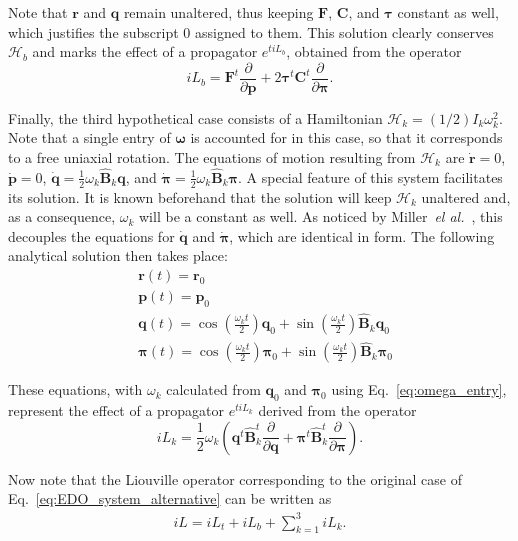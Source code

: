 \documentclass[aip,jcp,reprint,amsmath,amssymb,raggedbottom]{revtex4-1}
\newcommand{\mt}[1]{\boldsymbol{\mathbf{#1}}}           %
\newcommand{\vt}[1]{\boldsymbol{\mathbf{#1}}}           %
\newcommand{\tr}[1]{#1^t}                               %
\newcommand{\diff}[2]{\dfrac{\partial #1}{\partial #2}} %
\begin{document}
Note that $\vt r$ and $\vt q$ remain unaltered, thus keeping $\vt F$, $\mt C$, and $\vt \tau$ constant as well, which justifies the subscript $0$ assigned to them. This solution clearly conserves $\mathcal{H}_b$ and marks the effect of a propagator $e^{t i\!L_b}$, obtained from the operator
\[
i\!L_b = \tr{\vt F} \diff{}{\vt p} + 2 \tr{\vt \tau} \tr{\mt C} \diff{}{\vt \pi}.
\]

Finally, the third hypothetical case consists of a Hamiltonian $\mathcal{H}_k = (1/2) I_k \omega_k^2$. Note that a single entry of $\vt \omega$ is accounted for in this case, so that it corresponds to a free uniaxial rotation. The equations of motion resulting from $\mathcal{H}_k$ are $\dot{\vt r} = 0$, $\dot{\vt p} = 0$, $\dot{\vt q} = \frac{1}{2} \omega_k \hat{\mt B}_k \vt q$, and $\dot{\vt \pi} = \frac{1}{2} \omega_k \hat{\mt B}_k \vt \pi$. A special feature of this system facilitates its solution. It is known beforehand that the solution will keep $\mathcal{H}_k$ unaltered and, as a consequence, $\omega_k$ will be a constant as well. As noticed by Miller~\textit{el al.}~\cite{Miller2002}, this decouples the equations for $\dot{\vt q}$ and $\dot{\vt \pi}$, which are identical in form. The following analytical solution then takes place:\cite{Miller2002}
\begin{align*}
&{\vt r}(t) = {\vt r}_0 \\
&{\vt p}(t) = {\vt p}_0 \\
&{\vt q}(t) = \cos\left(\frac{\omega_k t}{2}\right) \vt q_0 + \sin\left(\frac{\omega_k t}{2}\right) \hat{\mt B}_k \vt q_0 \\
&{\vt \pi}(t) = \cos\left(\frac{\omega_k t}{2}\right) \vt \pi_0 + \sin\left(\frac{\omega_k t}{2}\right) \hat{\mt B}_k \vt \pi_0
\end{align*}

These equations, with $\omega_k$ calculated from $\vt q_0$ and $\vt \pi_0$ using Eq.~\ref{eq:omega_entry}, represent the effect of a propagator $e^{t i\!L_k}$ derived from the operator
\[
i\!L_k = \frac{1}{2} \omega_k \left( \tr{\vt q}\tr{\hat{\mt B}_k} \diff{}{\vt q} + \tr{\vt \pi}\tr{\hat{\mt B}_k} \diff{}{\vt \pi} \right).
\]

Now note that the Liouville operator corresponding to the original case of Eq.~\ref{eq:EDO_system_alternative} can be written as
\begin{align}
\label{eq:full_operator}
i\!L = i\!L_t + i\!L_b + \sum_{k=1}^3 i\!L_k.
\end{align}
\end{document}
